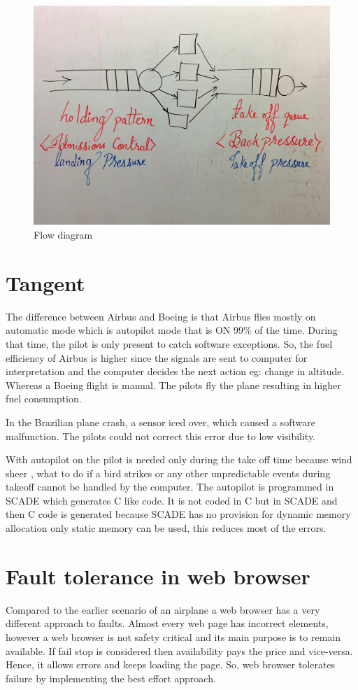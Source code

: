 \documentclass[twoside]{article}
\begin{document}
\begin{figure}[H]
\centering
\includegraphics[width=150mm]{airplane_queue.jpg}
\caption{Flow diagram \label{Queuing Diagram}}
\end{figure}

\section{Tangent}
The difference between Airbus and Boeing is that Airbus flies mostly on automatic mode which is autopilot mode that is ON 99\% of the time. During that time, the pilot is only present to catch software exceptions. So, the fuel efficiency of Airbus is higher since the signals are sent to computer for interpretation and the computer decides the next action eg: change in altitude. Whereas a Boeing flight is manual. The pilots fly the plane resulting in higher fuel consumption.

In the Brazilian plane crash, a sensor iced over, which caused a software malfunction. The pilots could not correct this error due to low visibility.

With autopilot on the pilot is needed only during the take off time because wind sheer , what to do if a bird strikes or any other unpredictable events during takeoff cannot be handled by the computer. The autopilot is programmed in SCADE which generates C like code. It is not coded in C but in SCADE and then C code is generated because SCADE has no provision for dynamic memory allocation only static memory can be used, this reduces most of the errors.


\section{Fault tolerance in web browser}
Compared to the earlier scenario of an airplane a web browser has a very different approach to faults. Almost every web page has incorrect elements, however a web browser is not safety critical and its main purpose is to remain available. If fail stop is considered then availability pays the price and vice-versa. Hence, it allows errors and keeps loading the page. So, web browser tolerates failure by implementing the best effort approach.
\end{document}

